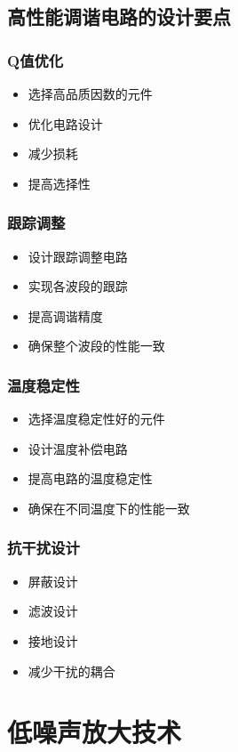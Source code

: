 \documentclass[12pt,UTF8]{ctexbook}
\begin{document}
\section{高性能调谐电路的设计要点}

\subsection{Q值优化}\begin{itemize}
  \item 选择高品质因数的元件
  \item 优化电路设计
  \item 减少损耗
  \item 提高选择性\end{itemize}

\subsection{跟踪调整}\begin{itemize}
  \item 设计跟踪调整电路
  \item 实现各波段的跟踪
  \item 提高调谐精度
  \item 确保整个波段的性能一致\end{itemize}

\subsection{温度稳定性}\begin{itemize}
  \item 选择温度稳定性好的元件
  \item 设计温度补偿电路
  \item 提高电路的温度稳定性
  \item 确保在不同温度下的性能一致\end{itemize}

\subsection{抗干扰设计}\begin{itemize}
  \item 屏蔽设计
  \item 滤波设计
  \item 接地设计
  \item 减少干扰的耦合\end{itemize}

\chapter{低噪声放大技术}
\end{document}
